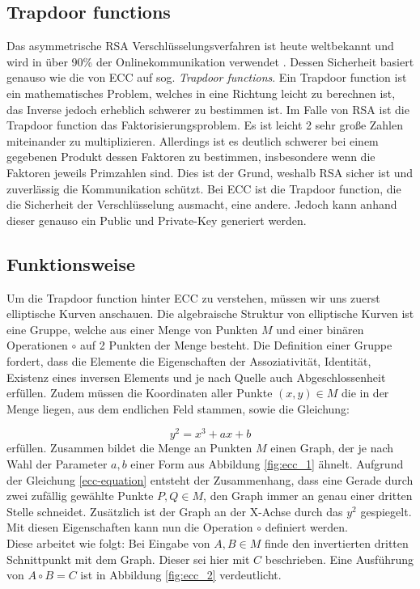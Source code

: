\documentclass[
	fontsize=12pt,
	headings=small,
	parskip=half,           %
	bibliography=totoc,
	numbers=noenddot,       %
	open=any,               %
]{scrreprt}
\begin{document}
\subsection{Trapdoor functions}
Das asymmetrische RSA Verschlüsselungsverfahren ist heute weltbekannt und wird in über 90\% der Onlinekommunikation verwendet \cite{ecc-rsa_amount}. Dessen Sicherheit basiert genauso wie die von ECC auf sog.  \textit{Trapdoor functions}. Ein Trapdoor function ist ein mathematisches Problem, welches in eine Richtung leicht zu berechnen ist, das Inverse jedoch erheblich schwerer zu bestimmen ist. Im Falle von RSA ist die Trapdoor function das Faktorisierungsproblem. Es ist leicht 2 sehr große Zahlen miteinander zu multiplizieren. Allerdings ist es deutlich schwerer bei einem gegebenen Produkt dessen Faktoren zu bestimmen, insbesondere wenn die Faktoren jeweils Primzahlen sind. Dies ist der Grund, weshalb RSA sicher ist und zuverlässig die Kommunikation schützt. Bei ECC ist die Trapdoor function, die die Sicherheit der Verschlüsselung ausmacht, eine andere. Jedoch kann anhand dieser genauso ein Public und Private-Key generiert werden.
\subsection{Funktionsweise}
Um die Trapdoor function hinter ECC zu verstehen, müssen wir uns zuerst elliptische Kurven anschauen. Die algebraische Struktur von elliptische Kurven ist eine Gruppe, welche aus einer Menge von Punkten $M$ und einer binären Operationen $\circ$ auf 2 Punkten der Menge besteht. Die Definition einer Gruppe fordert, dass die Elemente die Eigenschaften der Assoziativität, Identität, Existenz eines inversen Elements und je nach Quelle auch Abgeschlossenheit erfüllen. \cite{ecc-aradi2016einfuhrung}\cite{ecc-bogopolskij2008introduction} Zudem müssen die Koordinaten aller Punkte $(x,y) \in M$ die in der Menge liegen, aus dem endlichen Feld stammen, sowie die Gleichung:

\begin{equation}
    \label{ecc-equation}
    y^2 = x^3+ax+b
\end{equation} erfüllen. Zusammen bildet die Menge an Punkten $M$ einen Graph, der je nach Wahl der Parameter $a,b$ einer Form aus Abbildung \ref{fig:ecc_1} ähnelt. Aufgrund der Gleichung \ref{ecc-equation} entsteht der Zusammenhang, dass eine Gerade durch zwei zufällig gewählte Punkte $P,Q \in M$, den Graph immer an genau einer dritten Stelle schneidet. Zusätzlich ist der Graph an der X-Achse durch das $y^2$ gespiegelt. Mit diesen Eigenschaften kann nun die Operation $\circ$ definiert werden.\\
Diese arbeitet wie folgt: Bei Eingabe von $A,B \in M$ finde den invertierten dritten Schnittpunkt mit dem Graph. Dieser sei hier mit $C$ beschrieben. Eine Ausführung von $A \circ B = C$ ist in Abbildung \ref{fig:ecc_2} verdeutlicht.
\end{document}
